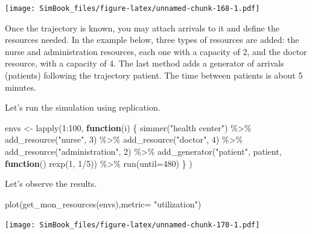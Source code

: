 \documentclass[
]{book}
\newenvironment{Shaded}{\begin{snugshade}}{\end{snugshade}}
\newcommand{\AttributeTok}[1]{\textcolor[rgb]{0.77,0.63,0.00}{#1}}
\newcommand{\ControlFlowTok}[1]{\textcolor[rgb]{0.13,0.29,0.53}{\textbf{#1}}}
\newcommand{\DecValTok}[1]{\textcolor[rgb]{0.00,0.00,0.81}{#1}}
\newcommand{\FunctionTok}[1]{\textcolor[rgb]{0.00,0.00,0.00}{#1}}
\newcommand{\NormalTok}[1]{#1}
\newcommand{\OtherTok}[1]{\textcolor[rgb]{0.56,0.35,0.01}{#1}}
\newcommand{\SpecialCharTok}[1]{\textcolor[rgb]{0.00,0.00,0.00}{#1}}
\newcommand{\StringTok}[1]{\textcolor[rgb]{0.31,0.60,0.02}{#1}}
\begin{document}
\texttt{[image: SimBook\_files/figure-latex/unnamed-chunk-168-1.pdf]}

Once the trajectory is known, you may attach arrivals to it and define the resources needed. In the example below, three types of resources are added: the nurse and administration resources, each one with a capacity of 2, and the doctor resource, with a capacity of 4. The last method adds a generator of arrivals (patients) following the trajectory patient. The time between patients is about 5 minutes.

Let's run the simulation using replication.

\begin{Shaded}
\begin{Highlighting}[]
\NormalTok{envs }\OtherTok{\textless{}{-}} \FunctionTok{lapply}\NormalTok{(}\DecValTok{1}\SpecialCharTok{:}\DecValTok{100}\NormalTok{, }\ControlFlowTok{function}\NormalTok{(i) \{}
\FunctionTok{simmer}\NormalTok{(}\StringTok{"health center"}\NormalTok{) }\SpecialCharTok{\%\textgreater{}\%}
  \FunctionTok{add\_resource}\NormalTok{(}\StringTok{"nurse"}\NormalTok{, }\DecValTok{3}\NormalTok{) }\SpecialCharTok{\%\textgreater{}\%}
  \FunctionTok{add\_resource}\NormalTok{(}\StringTok{"doctor"}\NormalTok{, }\DecValTok{4}\NormalTok{) }\SpecialCharTok{\%\textgreater{}\%}
  \FunctionTok{add\_resource}\NormalTok{(}\StringTok{"administration"}\NormalTok{, }\DecValTok{2}\NormalTok{) }\SpecialCharTok{\%\textgreater{}\%}
  \FunctionTok{add\_generator}\NormalTok{(}\StringTok{"patient"}\NormalTok{, patient, }\ControlFlowTok{function}\NormalTok{() }\FunctionTok{rexp}\NormalTok{(}\DecValTok{1}\NormalTok{, }\DecValTok{1}\SpecialCharTok{/}\DecValTok{5}\NormalTok{)) }\SpecialCharTok{\%\textgreater{}\%}
    \FunctionTok{run}\NormalTok{(}\AttributeTok{until=}\DecValTok{480}\NormalTok{)}
\NormalTok{\}}
\NormalTok{)}
\end{Highlighting}
\end{Shaded}

Let's observe the results.

\begin{Shaded}
\begin{Highlighting}[]
\FunctionTok{plot}\NormalTok{(}\FunctionTok{get\_mon\_resources}\NormalTok{(envs),}\AttributeTok{metric=} \StringTok{"utilization"}\NormalTok{)}
\end{Highlighting}
\end{Shaded}

\texttt{[image: SimBook\_files/figure-latex/unnamed-chunk-170-1.pdf]}
\end{document}
